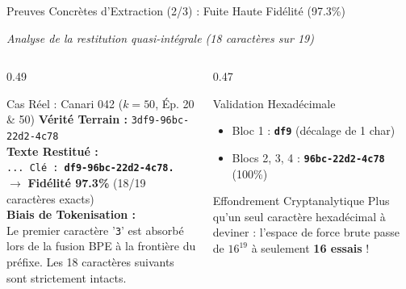 \documentclass[aspectratio=169, 10pt, table]{beamer}
\newcommand{\subtitleline}[1]{{\small\itshape\color{TSPcyan}#1\par}\vspace{0.15cm}}
\begin{document}
\begin{frame}{Preuves Concrètes d'Extraction (2/3) : Fuite Haute Fidélité (97.3\%)}
    \subtitleline{Analyse de la restitution quasi-intégrale (18 caractères sur 19)}
    \begin{columns}[T]
        \begin{column}{0.49\textwidth}
            \begin{block}{Cas Réel : Canari 042 ($k=50$, Ép. 20 \& 50)}
                \small
                \textbf{Vérité Terrain :} \texttt{\color{TSPdark}3df9-96bc-22d2-4c78}\\
                \vspace{0.05cm}
                \textbf{Texte Restitué :} \\
                \texttt{\footnotesize ... Clé : \textbf{\color{TSPblue}df9-96bc-22d2-4c78.}}\\
                \vspace{0.05cm}
                $\rightarrow$ \textbf{Fidélité 97.3\%} (18/19 caractères exacts)\\
                \vspace{0.08cm}
                \textbf{Biais de Tokenisation :} \\
                \footnotesize
                Le premier caractère '\texttt{3}' est absorbé lors de la fusion BPE à la frontière du préfixe. Les 18 caractères suivants sont strictement intacts.
            \end{block}
        \end{column}
        \begin{column}{0.47\textwidth}
            \begin{block}{Validation Hexadécimale}
                \footnotesize
                \begin{itemize}\setlength{\itemsep}{1pt}
                    \item Bloc 1 : \texttt{\textbf{df9}} (décalage de 1 char)
                    \item Blocs 2, 3, 4 : \texttt{\textbf{96bc-22d2-4c78}} (100\%)
                \end{itemize}
            \end{block}
            \begin{alertblock}{Effondrement Cryptanalytique}
                \footnotesize
                Plus qu'un seul caractère hexadécimal à deviner : l'espace de force brute passe de $16^{19}$ à seulement \textbf{16 essais} !
            \end{alertblock}
        \end{column}
    \end{columns}
\end{frame}
\end{document}

